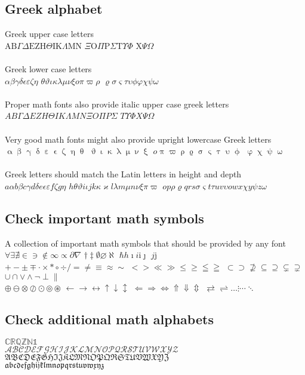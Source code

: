 \documentclass{scrartcl}
\renewcommand*{\i}{\ensuremath{\mathrm{i}}}
\renewcommand*{\j}{\ensuremath{\mathrm{j}}}
\begin{document}
\subsection{Greek alphabet}

Greek upper case letters\\
$\mathrm{AB}\Gamma\Delta \mathrm{EZH}\Theta \mathrm{IK}\Lambda\mathrm{MN}$
$\Xi\mathrm{O}\Pi\mathrm{P} \Sigma\mathrm{T}\Upsilon\Phi$
$\mathrm{X}\Psi\Omega$
\\
\\Greek lower case letters\\
$\alpha\beta\gamma\delta \epsilon\varepsilon\zeta\eta$
$\theta\vartheta\iota\kappa \lambda\mu\nu\xi o\pi\varpi\rho$
$\varrho\sigma\varsigma\tau \upsilon\phi\varphi\chi \psi\omega$ \\
\\Proper math fonts also provide italic upper case greek letters\\
$AB\varGamma\varDelta EZH\varTheta IK\varLambda MN\varXi O\varPi P\varSigma$
$T\varUpsilon\varPhi X\varPsi\varOmega$ \\
\\Very good math fonts might also provide upright lowercase Greek letters\\
$\upalpha\upbeta\upgamma\updelta\upepsilon\upvarepsilon\upzeta\upeta\uptheta$
$\upvartheta\upiota\upkappa\uplambda\upmu\upnu\upxi$
$o\uppi\upvarpi\uprho\upvarrho\upsigma\upvarsigma\uptau\upupsilon\upphi$
$\upvarphi\upchi\uppsi\upomega$\\
\\Greek letters should match the Latin letters in height and depth\\
$a\alpha b\beta c\gamma d\delta e\epsilon\varepsilon f\zeta g\eta$
$h\theta\vartheta i\iota jk\kappa\varkappa l\lambda m\mu n\nu\xi\pi\varpi$
$op\rho\varrho qrs\sigma\varsigma t\tau uv\upsilon owx\chi y\psi z\omega$

\subsection{Check important math symbols}

A collection of important math symbols that should be provided by any font\\
$\forall \exists \nexists \in \ni \notin \infty \propto \partial \nabla$
$\dagger\ddagger \emptyset\varnothing \aleph$ $\hbar h \imath i\i \jmath$
$j\j$\\
$+-\pm\mp \cdot\times\ast\circ\div / =\neq\equiv\approx\sim$
$<>\ll\gg\leq\geq\leqq\geqq$
$\subset\supset\nsupseteq\subseteq\supseteq\subsetneq\supsetneq$
$\cup\cap \vee\wedge\neg \perp\parallel$ \\
$\oplus\ominus\otimes\oslash\odot\circledcirc\circledast$
$\leftarrow\rightarrow\leftrightarrow\uparrow\downarrow\updownarrow$
$\Leftarrow\Rightarrow\Leftrightarrow\Uparrow\Downarrow\Updownarrow$
$\rightleftarrows\rightleftharpoons\dots\vdots\cdots\ddots$

\subsection{Check additional math alphabets}
$\mathbb{C}\mathbb{R}\mathbb{Q}\mathbb{Z}\mathbb{N}\mathbb{1}$\\
$\mathcal{ABCDEFGHIJKLMNOPQRSTUVWXYZ}$\\
$\mathfrak{ABCDEFGHIJKLMNOPQRSTUVWXYZ}$\\
$\mathfrak{abcdefghijklmnopqrstuvwxyz}$
\end{document}

